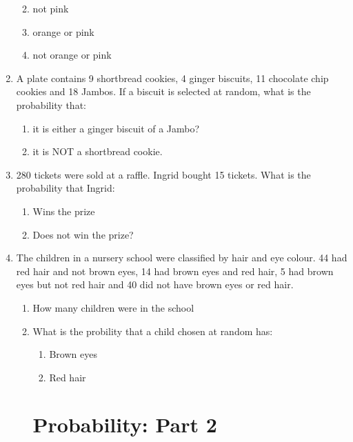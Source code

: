 \begin{enumerate}[noitemsep, label=\textbf{\arabic*}. ]
\begin{enumerate}[noitemsep, label=\textbf{\alph*}. ]
\label{m39373*uid122}\item not pink
\label{m39373*uid123}\item orange or pink
\label{m39373*uid124}\item not orange or pink
\end{enumerate}
                \label{m39373*uid125}\item A plate contains 9 shortbread cookies, 4 ginger
biscuits, 11 chocolate chip cookies and 18 Jambos. If a biscuit is selected at
random, what is the probability that:
\label{m39373*id116177}\begin{enumerate}[noitemsep, label=\textbf{\alph*}. ] 
            \label{m39373*uid126}\item it is either a ginger biscuit of a
Jambo?
\label{m39373*uid127}\item it is NOT a shortbread cookie.
\end{enumerate}
                \label{m39373*uid128}\item 280 tickets were sold at a raffle. Ingrid bought 15
tickets. What is the probability that Ingrid:
\label{m39373*id116219}\begin{enumerate}[noitemsep, label=\textbf{\alph*}. ] 
            \label{m39373*uid129}\item Wins the prize
\label{m39373*uid130}\item Does not win the prize?
\end{enumerate}
                \label{m39373*uid131}\item The children in a nursery school were classified by
hair and eye colour. 44 had red hair and not brown eyes, 14 had brown eyes and
red hair, 5 had brown eyes but not red hair and 40 did not have brown eyes or
red hair.
\label{m39373*id116261}\begin{enumerate}[noitemsep, label=\textbf{\alph*}. ] 
            \label{m39373*uid132}\item How many children were in the
school
\label{m39373*uid133}\item What is the probility that a child chosen at random
has:
\label{m39373*id116289}\begin{enumerate}[noitemsep, label=\textbf{\arabic*}. ] 
            \label{m39373*uid134}\item Brown eyes
\label{m39373*uid135}\item Red hair
\end{enumerate}     \section{ Probability: Part 2}

\end{enumerate}
\end{enumerate}
